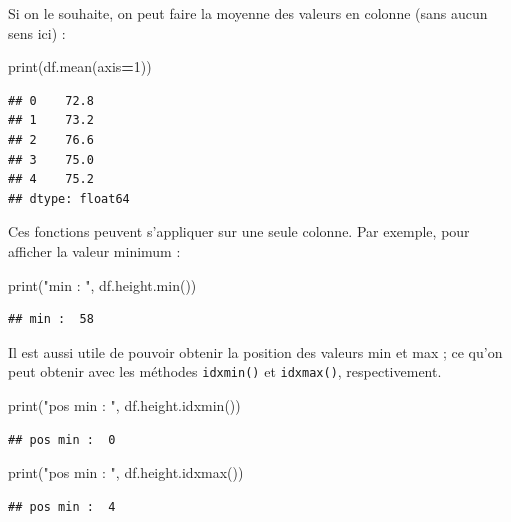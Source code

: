 \documentclass[12pt,]{book}
\newenvironment{Shaded}{\begin{snugshade}}{\end{snugshade}}
\newcommand{\DecValTok}[1]{\textcolor[rgb]{0.00,0.00,0.81}{#1}}
\newcommand{\StringTok}[1]{\textcolor[rgb]{0.31,0.60,0.02}{#1}}
\newcommand{\OperatorTok}[1]{\textcolor[rgb]{0.81,0.36,0.00}{\textbf{#1}}}
\newcommand{\BuiltInTok}[1]{#1}
\newcommand{\NormalTok}[1]{#1}
\numberwithin{equation}{section}
\numberwithin{countremarque}{section}
\begin{document}
Si on le souhaite, on peut faire la moyenne des valeurs en colonne (sans
aucun sens ici) :

\begin{Shaded}
\begin{Highlighting}[]
\BuiltInTok{print}\NormalTok{(df.mean(axis}\OperatorTok{=}\DecValTok{1}\NormalTok{))}
\end{Highlighting}
\end{Shaded}

\begin{lstlisting}
## 0    72.8
## 1    73.2
## 2    76.6
## 3    75.0
## 4    75.2
## dtype: float64
\end{lstlisting}

Ces fonctions peuvent s'appliquer sur une seule colonne. Par exemple,
pour afficher la valeur minimum :

\begin{Shaded}
\begin{Highlighting}[]
\BuiltInTok{print}\NormalTok{(}\StringTok{"min : "}\NormalTok{, df.height.}\BuiltInTok{min}\NormalTok{())}
\end{Highlighting}
\end{Shaded}

\begin{lstlisting}
## min :  58
\end{lstlisting}

Il est aussi utile de pouvoir obtenir la position des valeurs min et max
; ce qu'on peut obtenir avec les méthodes \texttt{idxmin()} et
\texttt{idxmax()}, respectivement.

\begin{Shaded}
\begin{Highlighting}[]
\BuiltInTok{print}\NormalTok{(}\StringTok{"pos min : "}\NormalTok{, df.height.idxmin())}
\end{Highlighting}
\end{Shaded}

\begin{lstlisting}
## pos min :  0
\end{lstlisting}

\begin{Shaded}
\begin{Highlighting}[]
\BuiltInTok{print}\NormalTok{(}\StringTok{"pos min : "}\NormalTok{, df.height.idxmax())}
\end{Highlighting}
\end{Shaded}

\begin{lstlisting}
## pos min :  4
\end{lstlisting}
\end{document}
